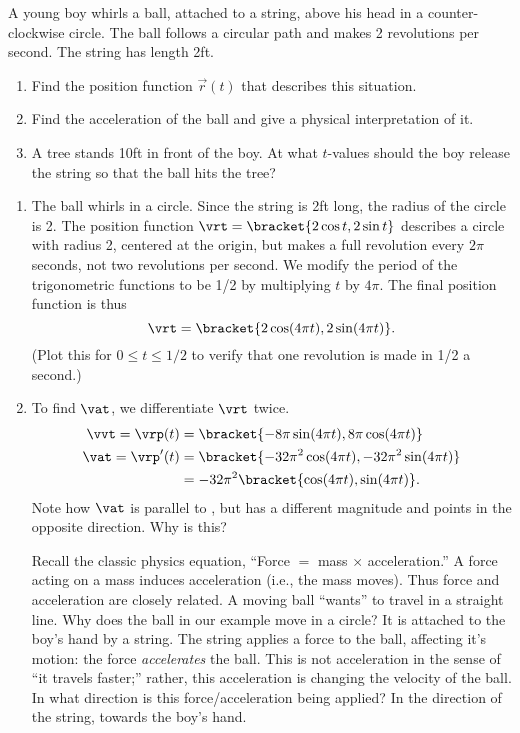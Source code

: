 \begin{example}\label{ex_motion3}
A young boy whirls a ball, attached to a string, above his head in a counter-clockwise circle. The ball follows a circular path and makes 2 revolutions per second. The string has length 2ft.
\begin{enumerate}
	\item Find the position function $\vec r(t)$ that describes this situation.
	\item	Find the acceleration of the ball and give a physical interpretation of it.
	\item	A tree stands 10ft in front of the boy. At what $t$-values should the boy release the string so that the ball hits the tree?
\end{enumerate}
\solution
\begin{enumerate}
	\item The ball whirls in a  circle. Since the string is 2ft long, the radius of the circle is 2. The position function $\vrt =\bracket{2\cos t, 2\sin t}$ describes a circle with radius 2, centered at the origin, but makes a full revolution every $2\pi$ seconds, not two revolutions per second. We modify the period of the trigonometric functions to be 1/2 by multiplying $t$ by $4\pi$. The final position function is thus \[\vrt =\bracket{2\cos (4\pi t), 2\sin (4\pi t)}.\]
	(Plot this for $0\leq t\leq 1/2$ to verify that one revolution is made in 1/2 a second.)
	
	\item		To find $\vat$, we differentiate $\vrt$ twice.
	\begin{align*}
	\vvt = \vrp(t) &=\bracket{-8\pi \sin (4\pi t), 8\pi \cos (4\pi t)}\\
	\vat =\vrp'(t) &=\bracket{-32\pi^2 \cos (4\pi t), -32\pi^2 \sin (4\pi t)}\\
				&= -32\pi^2\bracket{\cos (4\pi t), \sin (4\pi t)}.
	\end{align*}
	Note how $\vat$ is parallel to \vrt, but has a different magnitude and points in the opposite direction. Why is this?
	
	Recall the classic physics equation, ``Force $=$ mass $\times$ acceleration.'' A force acting on a mass induces acceleration (i.e., the mass moves).
	Thus force and acceleration are closely related. A moving ball ``wants'' to travel in a straight line. Why does the ball in our example move in a circle? It is attached to the boy's hand by a string. The string applies a force to the ball, affecting it's motion: the force \emph{accelerates} the ball. This is not acceleration in the sense of ``it travels faster;'' rather, this acceleration is changing the velocity of the ball. In what direction is this force/acceleration being applied? In the direction of the string, towards the boy's hand.
	

\end{enumerate}
\end{example}
